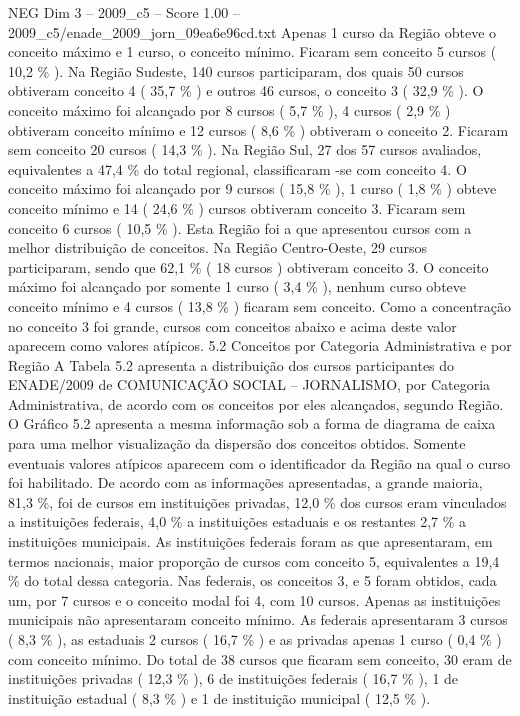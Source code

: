 \begin{textsample}{NEG Dim 3 – 2009\_c5 – Score 1.00 – 2009\_c5/enade\_2009\_jorn\_09ea6e96cd.txt}
Apenas 1 curso da Região obteve o conceito máximo e 1 curso, o conceito mínimo.
Ficaram sem conceito 5 cursos ( 10,2 \% ).
Na Região Sudeste, 140 cursos participaram, dos quais 50 cursos obtiveram conceito 4 ( 35,7 \% ) e outros 46 cursos, o conceito 3 ( 32,9 \% ).
O conceito máximo foi alcançado por 8 cursos ( 5,7 \% ), 4 cursos ( 2,9 \% ) obtiveram conceito mínimo e 12 cursos ( 8,6 \% ) obtiveram o conceito 2.
Ficaram sem conceito 20 cursos ( 14,3 \% ).
Na Região Sul, 27 dos 57 cursos avaliados, equivalentes a 47,4 \% do total regional, classificaram -se com conceito 4.
O conceito máximo foi alcançado por 9 cursos ( 15,8 \% ), 1 curso ( 1,8 \% ) obteve conceito mínimo e 14 ( 24,6 \% ) cursos obtiveram conceito 3.
Ficaram sem conceito 6 cursos ( 10,5 \% ).
Esta Região foi a que apresentou cursos com a melhor distribuição de conceitos.
Na Região Centro-Oeste, 29 cursos participaram, sendo que 62,1 \% ( 18 cursos ) obtiveram conceito 3.
O conceito máximo foi alcançado por somente 1 curso ( 3,4 \% ), nenhum curso obteve conceito mínimo e 4 cursos ( 13,8 \% ) ficaram sem conceito.
Como a concentração no conceito 3 foi grande, cursos com conceitos abaixo e acima deste valor aparecem como valores atípicos. 5.2 Conceitos por Categoria Administrativa e por Região A Tabela 5.2 apresenta a distribuição dos cursos participantes do ENADE/2009 de COMUNICAÇÃO SOCIAL – JORNALISMO, por Categoria Administrativa, de acordo com os conceitos por eles alcançados, segundo Região.
O Gráfico 5.2 apresenta a mesma informação sob a forma de diagrama de caixa para uma melhor visualização da dispersão dos conceitos obtidos.
Somente eventuais valores atípicos aparecem com o identificador da Região na qual o curso foi habilitado.
De acordo com as informações apresentadas, a grande maioria, 81,3 \%, foi de cursos em instituições privadas, 12,0 \% dos cursos eram vinculados a instituições federais, 4,0 \% a instituições estaduais e os restantes 2,7 \% a instituições municipais.
As instituições federais foram as que apresentaram, em termos nacionais, maior proporção de cursos com conceito 5, equivalentes a 19,4 \% do total dessa categoria.
Nas federais, os conceitos 3, e 5 foram obtidos, cada um, por 7 cursos e o conceito modal foi 4, com 10 cursos.
Apenas as instituições municipais não apresentaram conceito mínimo.
As federais apresentaram 3 cursos ( 8,3 \% ), as estaduais 2 cursos ( 16,7 \% ) e as privadas apenas 1 curso ( 0,4 \% ) com conceito mínimo.
Do total de 38 cursos que ficaram sem conceito, 30 eram de instituições privadas ( 12,3 \% ), 6 de instituições federais ( 16,7 \% ), 1 de instituição estadual ( 8,3 \% ) e 1 de instituição municipal ( 12,5 \% ).

\end{textsample}
